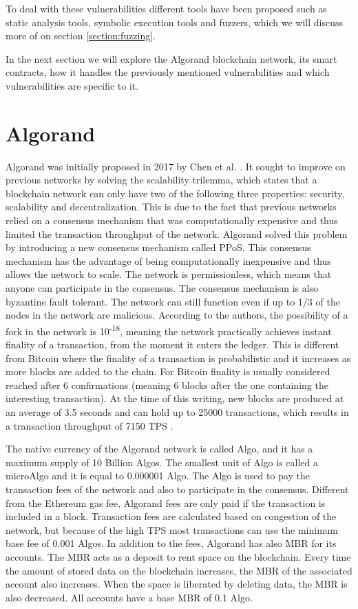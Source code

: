 To deal with these vulnerabilities different tools have been proposed such as static analysis tools, symbolic execution tools and fuzzers, which we will discuss more of on section \ref{section:fuzzing}.

In the next section we will explore the Algorand blockchain network, its smart contracts, how it handles the previously mentioned vulnerabilities and which vulnerabilities are specific to it.

\section{Algorand} \label{section:algorand}
Algorand was initially proposed in 2017 by Chen et al. \cite{chen_algorand_2017}. It sought to improve on previous networks by solving the scalability trilemma, which states that a blockchain network can only have two of the following three properties: security, scalability and decentralization. This is due to the fact that previous networks relied on a consensus mechanism that was computationally expensive and thus limited the transaction throughput of the network. Algorand solved this problem by introducing a new consensus mechanism called \ac{PPoS}. This consensus mechanism has the advantage of being computationally inexpensive and thus allows the network to scale. The network is permissionless, which means that anyone can participate in the consensus. The consensus mechanism is also byzantine fault tolerant. The network can still function even if up to 1/3 of the nodes in the network are malicious. According to the authors, the possibility of a fork in the network is 10\textsuperscript{-18}, meaning the network practically achieves instant finality of a transaction, from the moment it enters the ledger. This is different from Bitcoin where the finality of a transaction is probabilistic and it increases as more blocks are added to the chain. For Bitcoin finality is usually considered reached after 6 confirmations (meaning 6 blocks after the one containing the interesting transaction). At the time of this writing, new blocks are produced at an average of 3.5 seconds and can hold up to 25000 transactions, which results in a transaction throughput of 7150 \ac{TPS} \cite{noauthor_algorand_nodate-3}.

The native currency of the Algorand network is called Algo, and it has a maximum supply of 10 Billion Algos. The smallest unit of Algo is called a microAlgo and it is equal to 0.000001 Algo. The Algo is used to pay the transaction fees of the network and also to participate in the consensus. Different from the Ethereum gas fee, Algorand fees are only paid if the transaction is included in a block. Transaction fees are calculated based on congestion of the network, but because of the high TPS most transactions can use the minimum base fee of 0.001 Algos. In addition to the fees, Algorand has also \ac{MBR} for its accounts. The \ac{MBR} acts as a deposit to rent space on the blockchain. Every time the amount of stored data on the blockchain increases, the \ac{MBR} of the associated account also increases. When the space is liberated by deleting data, the \ac{MBR} is also decreased. All accounts have a base \ac{MBR} of 0.1 Algo.

